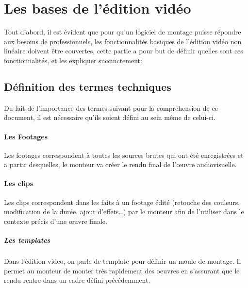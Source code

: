 \newpage

\section{Les bases de l'édition vidéo}

\paragraph{}

Tout d'abord, il est évident que pour qu'un logiciel de montage puisse répondre
aux besoins de professionnels, les fonctionnalités basiques de l'édition vidéo
non linéaire doivent être couvertes, cette partie a pour but de définir quelles
sont ces fonctionnalités, et les expliquer succinctement:

\subsection{Définition des termes techniques}

\paragraph {}

Du fait de l'importance des termes suivant pour la compréhension de ce document,
il est nécessaire qu'ils soient défini au sein même de celui-ci.

\paragraph{Les Footages}

Les footages correspondent à toutes les sources brutes qui ont été enregistrées
et a partir desquelles, le monteur va créer le rendu final de l'œuvre
audiovisuelle.

\paragraph{Les clips}

Les clips correspondent dans les faits à un footage édité (retouche des
couleurs, modification de la durée, ajout d'effets\ldots) par le monteur
afin de l'utiliser dans le contexte précis d'une œuvre finale.

\subparagraph{Les templates}

Dans l'édition video, on parle de template pour définir un moule de montage.
Il permet au monteur de monter très rapidement des oeuvres en
s'assurant que le rendu rentre dans un cadre défini précédemment.

